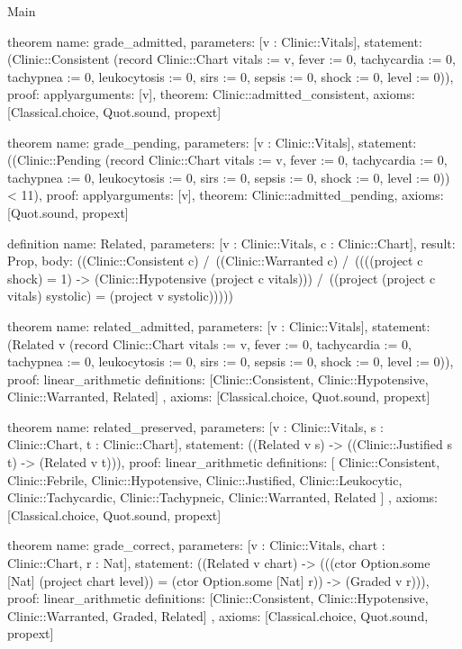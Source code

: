 \begin{lexlean}{Main}
\begin{semanticmodule}
theorem{
  name: grade_admitted,
  parameters: [v : Clinic::Vitals],
  statement: (Clinic::Consistent (record Clinic::Chart {vitals := v, fever := 0, tachycardia := 0, tachypnea := 0, leukocytosis := 0, sirs := 0, sepsis := 0, shock := 0, level := 0})),
  proof: apply{arguments: [v], theorem: Clinic::admitted_consistent},
  axioms: [Classical.choice, Quot.sound, propext]
}

theorem{
  name: grade_pending,
  parameters: [v : Clinic::Vitals],
  statement: ((Clinic::Pending (record Clinic::Chart {vitals := v, fever := 0, tachycardia := 0, tachypnea := 0, leukocytosis := 0, sirs := 0, sepsis := 0, shock := 0, level := 0})) < 11),
  proof: apply{arguments: [v], theorem: Clinic::admitted_pending},
  axioms: [Quot.sound, propext]
}

definition{
  name: Related,
  parameters: [v : Clinic::Vitals, c : Clinic::Chart],
  result: Prop,
  body: ((Clinic::Consistent c) /\ ((Clinic::Warranted c) /\ ((((project c shock) = 1) -> (Clinic::Hypotensive (project c vitals))) /\ ((project (project c vitals) systolic) = (project v systolic)))))
}

theorem{
  name: related_admitted,
  parameters: [v : Clinic::Vitals],
  statement: (Related v (record Clinic::Chart {vitals := v, fever := 0, tachycardia := 0, tachypnea := 0, leukocytosis := 0, sirs := 0, sepsis := 0, shock := 0, level := 0})),
  proof: linear_arithmetic{
    definitions: [Clinic::Consistent, Clinic::Hypotensive, Clinic::Warranted, Related]
  },
  axioms: [Classical.choice, Quot.sound, propext]
}

theorem{
  name: related_preserved,
  parameters: [v : Clinic::Vitals, s : Clinic::Chart, t : Clinic::Chart],
  statement: ((Related v s) -> ((Clinic::Justified s t) -> (Related v t))),
  proof: linear_arithmetic{
    definitions: [
      Clinic::Consistent,
      Clinic::Febrile,
      Clinic::Hypotensive,
      Clinic::Justified,
      Clinic::Leukocytic,
      Clinic::Tachycardic,
      Clinic::Tachypneic,
      Clinic::Warranted,
      Related
    ]
  },
  axioms: [Classical.choice, Quot.sound, propext]
}

theorem{
  name: grade_correct,
  parameters: [v : Clinic::Vitals, chart : Clinic::Chart, r : Nat],
  statement: ((Related v chart) -> (((ctor Option.some [Nat] (project chart level)) = (ctor Option.some [Nat] r)) -> (Graded v r))),
  proof: linear_arithmetic{
    definitions: [Clinic::Consistent, Clinic::Hypotensive, Clinic::Warranted, Graded, Related]
  },
  axioms: [Classical.choice, Quot.sound, propext]
}


\end{semanticmodule}
\end{lexlean}
